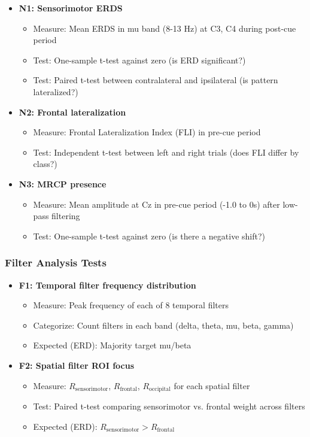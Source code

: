\begin{itemize}
    \item \textbf{N1: Sensorimotor ERDS}
    \begin{itemize}
        \item Measure: Mean ERDS in mu band (8-13 Hz) at C3, C4 during post-cue period
        \item Test: One-sample t-test against zero (is ERD significant?)
        \item Test: Paired t-test between contralateral and ipsilateral (is pattern lateralized?)
    \end{itemize}
    
    \item \textbf{N2: Frontal lateralization}
    \begin{itemize}
        \item Measure: Frontal Lateralization Index (FLI) in pre-cue period
        \item Test: Independent t-test between left and right trials (does FLI differ by class?)
    \end{itemize}
    
    \item \textbf{N3: MRCP presence}
    \begin{itemize}
        \item Measure: Mean amplitude at Cz in pre-cue period (-1.0 to 0s) after low-pass filtering
        \item Test: One-sample t-test against zero (is there a negative shift?)
    \end{itemize}
\end{itemize}

\subsubsection{Filter Analysis Tests}

\begin{itemize}
    \item \textbf{F1: Temporal filter frequency distribution}
    \begin{itemize}
        \item Measure: Peak frequency of each of 8 temporal filters
        \item Categorize: Count filters in each band (delta, theta, mu, beta, gamma)
        \item Expected (ERD): Majority target mu/beta
    \end{itemize}
    
    \item \textbf{F2: Spatial filter ROI focus}
    \begin{itemize}
        \item Measure: $R_{\text{sensorimotor}}$, $R_{\text{frontal}}$, $R_{\text{occipital}}$ for each spatial filter
        \item Test: Paired t-test comparing sensorimotor vs. frontal weight across filters
        \item Expected (ERD): $R_{\text{sensorimotor}} > R_{\text{frontal}}$
    \end{itemize}
\end{itemize}

